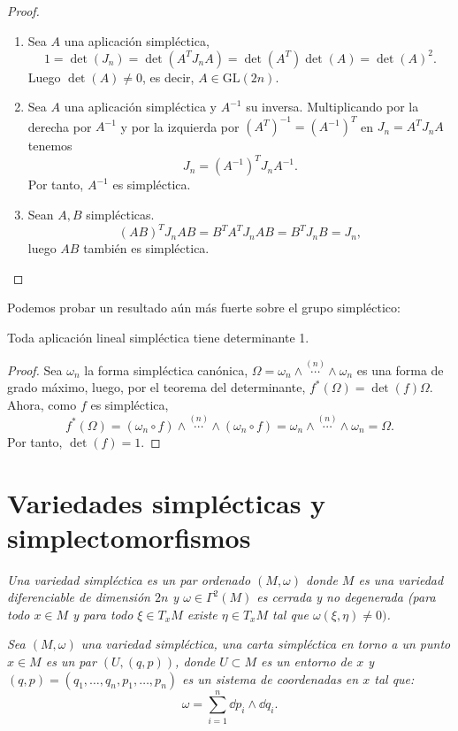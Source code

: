 \begin{proof}\leavevmode
  \begin{enumerate}
    \item Sea $A$ una aplicación simpléctica,
      \[
	1= \det(J_n) = \det(A^T J_n A) = \det(A^T)\det(A) = \det(A)^2.
      \]
      Luego $\det(A) \neq 0$, es decir, $A \in \mathrm{GL}(2n)$.
    \item Sea $A$ una aplicación simpléctica y $A^{-1}$ su inversa. Multiplicando por la derecha por $A^{-1}$ y por la izquierda por $(A^T)^{-1}=(A^{-1})^T$ en $J_n=A^T J_n A$ tenemos 
      \[
	J_n = (A^{-1})^T J_n A^{-1}.
      \]
      Por tanto, $A^{-1}$ es simpléctica.
    \item Sean $A, B$ simplécticas.
      \[
	(AB)^T J_n AB = B^T A^T J_n A B = B^T J_n B = J_n,
      \]
      luego $AB$ también es simpléctica.
  \end{enumerate}
\end{proof}

Podemos probar un resultado aún más fuerte sobre el grupo simpléctico:
\begin{prop}
  Toda aplicación lineal simpléctica tiene determinante 1.
\end{prop}
\begin{proof}
  Sea $\omega_n$ la forma simpléctica canónica, $\Omega=\omega_n \wedge \overset{(n)}{\cdots} \wedge \omega_n$ es una forma de grado máximo, luego, por el teorema del determinante, $f^*(\Omega)=\det(f) \Omega$. Ahora, como $f$ es simpléctica, 
  \begin{equation*}
    f^*(\Omega) = (\omega_n \circ f) \wedge \overset{(n)}{\cdots} \wedge (\omega_n \circ f)=\omega_n \wedge \overset{(n)}{\cdots} \wedge \omega_n = \Omega.
  \end{equation*}
  Por tanto, $\det(f)=1$.
\end{proof}
\section{Variedades simplécticas y simplectomorfismos}\label{sec:variedades}
\begin{defn}
  \em
  Una \emph{variedad simpléctica} es un par ordenado $(M,\omega)$ donde $M$ es una variedad diferenciable de dimensión $2n$ y $\omega \in \Gamma^2(M)$ es cerrada y no degenerada (para todo $x \in M$ y para todo $\xi \in T_xM$ existe $\eta \in T_xM$ tal que $\omega(\xi,\eta)\neq0)$. 
\end{defn}
\begin{defn}
  \em
  Sea $(M,\omega)$ una variedad simpléctica, una \emph{carta simpléctica en torno a un punto $x \in M$} es un par $(U,(q,p))$, donde $U\subset M$ es un entorno de $x$ y $(q,p)=(q_1,\dots,q_n,p_1,\dots,p_n)$ es un sistema de coordenadas en $x$ tal que:
\begin{equation}
  \omega= \sum_{i=1}^n \dd p_i \wedge \dd q_i.
  \label{forma}
\end{equation}
\end{defn}

